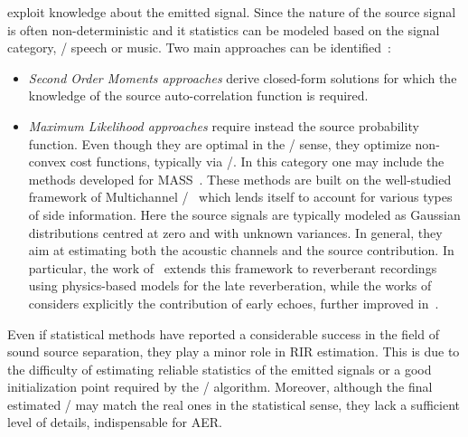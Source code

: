  exploit knowledge about the emitted signal.
Since the nature of the source signal is often non-deterministic and it statistics can be modeled based on the signal category, \eg/ speech or music.
Two main approaches can be identified~:
\begin{itemize}
    \item \textit{Second Order Moments approaches} derive closed-form solutions for which the knowledge of the source auto-correlation function is required.
    \item \textit{Maximum Likelihood approaches} require instead the source probability function.
    Even though they are optimal in the \ML/ sense, they optimize non-convex cost functions, typically via \EMdef/.
    In this category one may include the methods developed for \ac{MASS}~.
    These methods are built on the well-studied framework of Multichannel \NMF/~ which lends itself to account for various types of side information.
    Here the source signals are typically modeled as Gaussian distributions centred at zero and with unknown variances.
    In general, they aim at estimating both the acoustic channels and the source contribution.
    In particular, the work of~ extends this framework to reverberant recordings using physics-based models for the late reverberation, while the works of~ considers explicitly the contribution of early echoes, further improved in~.
\end{itemize}
Even if statistical methods have reported a considerable success in the field of sound source separation, they play a minor role in \ac{RIR} estimation.
This is due to the difficulty of estimating reliable statistics of the emitted signals or a good initialization point required by the \EM/ algorithm.
Moreover, although the final estimated \RIRs/ may match the real ones in the statistical sense, they lack a sufficient level of details, indispensable for \ac{AER}.


